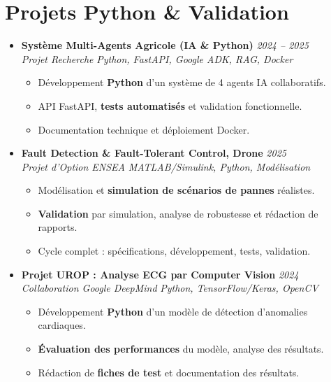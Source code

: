 \documentclass[a4paper,11pt]{article}
\begin{document}
\section{Projets Python \& Validation}
\begin{itemize}[leftmargin=*, label={-}]

\item \textbf{Système Multi-Agents Agricole (IA \& Python)} \hfill \textit{2024 -- 2025} \\
\textit{Projet Recherche} \hfill \textit{Python, FastAPI, Google ADK, RAG, Docker}
\vspace{-2pt}
    \begin{itemize}[leftmargin=0.4cm, nosep, label=\tiny$\bullet$]
        \item \small{Développement \textbf{Python} d'un système de 4 agents IA collaboratifs.}
        \item \small{API FastAPI, \textbf{tests automatisés} et validation fonctionnelle.}
        \item \small{Documentation technique et déploiement Docker.}
    \end{itemize}
\vspace{3pt}

\item \textbf{Fault Detection \& Fault-Tolerant Control, Drone} \hfill \textit{2025} \\
\textit{Projet d'Option ENSEA} \hfill \textit{MATLAB/Simulink, Python, Modélisation}
\vspace{-2pt}
    \begin{itemize}[leftmargin=0.4cm, nosep, label=\tiny$\bullet$]
        \item \small{Modélisation et \textbf{simulation de scénarios de pannes} réalistes.}
        \item \small{\textbf{Validation} par simulation, analyse de robustesse et rédaction de rapports.}
        \item \small{Cycle complet : spécifications, développement, tests, validation.}
    \end{itemize}
\vspace{3pt}

\item \textbf{Projet UROP : Analyse ECG par Computer Vision} \hfill \textit{2024} \\
\textit{Collaboration Google DeepMind} \hfill \textit{Python, TensorFlow/Keras, OpenCV}
\vspace{-2pt}
    \begin{itemize}[leftmargin=0.4cm, nosep, label=\tiny$\bullet$]
        \item \small{Développement \textbf{Python} d'un modèle de détection d'anomalies cardiaques.}
        \item \small{\textbf{Évaluation des performances} du modèle, analyse des résultats.}
        \item \small{Rédaction de \textbf{fiches de test} et documentation des résultats.}
    \end{itemize}
\vspace{3pt}


\end{itemize}
\end{document}
